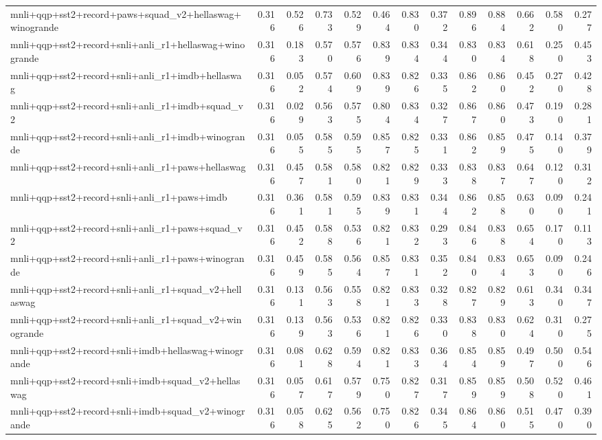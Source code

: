 \begin{table}[t]
\begin{tabular}{lrrrrrrrrrrrr}
    mnli+qqp+sst2+record+paws+squad\_v2+hellaswag+winogrande & 0.316 & 0.526 & 0.733 & 0.529 & 0.464 & 0.830 & 0.372 & 0.896 & 0.884 & 0.662 & 0.580 & 0.277 \\
    mnli+qqp+sst2+record+snli+anli\_r1+hellaswag+winogrande & 0.316 & 0.183 & 0.570 & 0.576 & 0.839 & 0.834 & 0.344 & 0.830 & 0.834 & 0.618 & 0.250 & 0.453 \\
    mnli+qqp+sst2+record+snli+anli\_r1+imdb+hellaswag & 0.316 & 0.052 & 0.574 & 0.609 & 0.839 & 0.826 & 0.335 & 0.862 & 0.860 & 0.452 & 0.270 & 0.428 \\
    mnli+qqp+sst2+record+snli+anli\_r1+imdb+squad\_v2 & 0.316 & 0.029 & 0.563 & 0.575 & 0.804 & 0.834 & 0.327 & 0.867 & 0.860 & 0.473 & 0.190 & 0.281 \\
    mnli+qqp+sst2+record+snli+anli\_r1+imdb+winogrande & 0.316 & 0.055 & 0.585 & 0.595 & 0.857 & 0.825 & 0.331 & 0.862 & 0.859 & 0.475 & 0.140 & 0.379 \\
    mnli+qqp+sst2+record+snli+anli\_r1+paws+hellaswag & 0.316 & 0.457 & 0.581 & 0.580 & 0.821 & 0.829 & 0.333 & 0.838 & 0.837 & 0.647 & 0.120 & 0.312 \\
    mnli+qqp+sst2+record+snli+anli\_r1+paws+imdb & 0.316 & 0.361 & 0.581 & 0.595 & 0.839 & 0.831 & 0.344 & 0.862 & 0.858 & 0.630 & 0.090 & 0.241 \\
    mnli+qqp+sst2+record+snli+anli\_r1+paws+squad\_v2 & 0.316 & 0.452 & 0.588 & 0.536 & 0.821 & 0.832 & 0.293 & 0.846 & 0.838 & 0.654 & 0.170 & 0.113 \\
    mnli+qqp+sst2+record+snli+anli\_r1+paws+winogrande & 0.316 & 0.459 & 0.585 & 0.564 & 0.857 & 0.831 & 0.352 & 0.840 & 0.834 & 0.653 & 0.090 & 0.246 \\
    mnli+qqp+sst2+record+snli+anli\_r1+squad\_v2+hellaswag & 0.316 & 0.131 & 0.563 & 0.558 & 0.821 & 0.833 & 0.328 & 0.827 & 0.829 & 0.613 & 0.340 & 0.347 \\
    mnli+qqp+sst2+record+snli+anli\_r1+squad\_v2+winogrande & 0.316 & 0.139 & 0.563 & 0.536 & 0.821 & 0.826 & 0.330 & 0.838 & 0.830 & 0.624 & 0.310 & 0.275 \\
    mnli+qqp+sst2+record+snli+imdb+hellaswag+winogrande & 0.316 & 0.081 & 0.628 & 0.594 & 0.821 & 0.833 & 0.364 & 0.854 & 0.859 & 0.497 & 0.500 & 0.546 \\
    mnli+qqp+sst2+record+snli+imdb+squad\_v2+hellaswag & 0.316 & 0.057 & 0.617 & 0.579 & 0.750 & 0.827 & 0.317 & 0.859 & 0.859 & 0.508 & 0.520 & 0.461 \\
    mnli+qqp+sst2+record+snli+imdb+squad\_v2+winogrande & 0.316 & 0.058 & 0.625 & 0.562 & 0.750 & 0.826 & 0.345 & 0.864 & 0.860 & 0.515 & 0.470 & 0.390 \\

\end{tabular}
\end{table}
